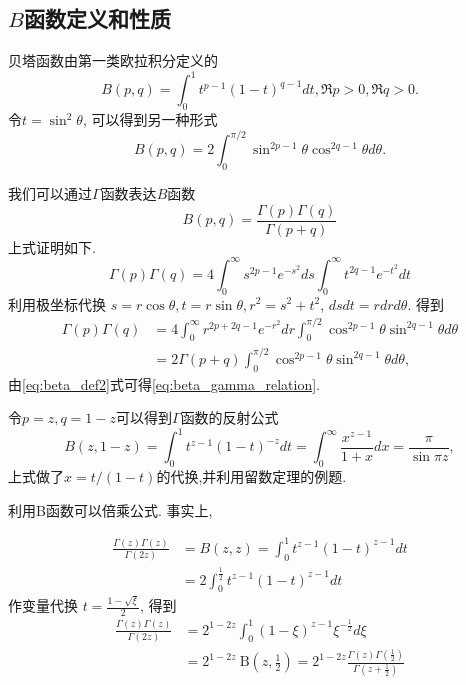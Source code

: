 \subsection{$B$函数定义和性质}
贝塔函数由第一类欧拉积分定义的
\begin{equation}
    B(p, q) = \int_0^1 t^{p -1} (1-t)^{q-1} dt, \Re p> 0, \Re q >0.
    \label{eq:beta_def1}
\end{equation}
令$t=\sin^2{\theta}$, 可以得到另一种形式
\begin{equation}
    B(p, q)  = 2\int_{0}^{\pi/2} \sin ^{2p -1}{\theta} \cos^{2q -1}{\theta} d\theta.
    \label{eq:beta_def2}
\end{equation}

我们可以通过$\Gamma$函数表达$B$函数
\begin{equation}
B(p, q)=\frac{\Gamma(p) \Gamma(q)}{\Gamma(p+q)}
\label{eq:beta_gamma_relation}
\end{equation}
上式证明如下.
$$
\Gamma(p) \Gamma(q)=4 \int_{0}^{\infty} s^{2 p-1} e^{-s^{2}} d s \int_{0}^{\infty} t^{2 q-1} e^{-t^{2}} d t
$$
利用极坐标代换
 $s=r \cos \theta, t=r \sin \theta, r^{2}=s^{2}+t^{2}$,  $d s d t=r d r d \theta$.
 得到
 $$
 \begin{aligned}
 \Gamma(p) \Gamma(q) & =4 \int_{0}^{\infty} r^{2 p+2 q-1} e^{-r^{2}} d r \int_{0}^{\pi / 2} \cos ^{2 p-1} \theta \sin ^{2 q-1} \theta d \theta \\
 & =2 \Gamma(p+q) \int_{0}^{\pi / 2} \cos ^{2 p-1} \theta \sin ^{2 q-1} \theta d \theta,
 \end{aligned}
 $$
 由\eqref{eq:beta_def2}式可得\eqref{eq:beta_gamma_relation}.

令$p=z, q=1-z$可以得到$\Gamma$函数的反射公式
\begin{equation}
    B(z, 1-z) = \int_0^{1} t^{z-1} (1-t)^{-z} dt 
     = \int_0^{\infty} \frac{x^{z-1}}{1+x} dx
     = \frac{\pi}{\sin{\pi z} }, 
\end{equation}
上式做了$x = t/(1-t)$的代换,并利用留数定理的例题.


利用B函数可以倍乘公式. 事实上,

\begin{equation}
\begin{aligned}
\frac{\Gamma(z) \Gamma(z)}{\Gamma(2 z)} & =B(z, z)=\int_{0}^{1} t^{z-1}(1-t)^{z-1} d t \\
& =2 \int_{0}^{\frac{1}{2}} t^{z-1}(1-t)^{z-1} d t
\end{aligned}
\end{equation}
作变量代换 $t=\frac{1-\sqrt{\xi}}{2}$, 得到
$$
\begin{aligned}
\frac{\Gamma(z) \Gamma(z)}{\Gamma(2 z)} & =2^{1-2 z} \int_{0}^{1}(1-\xi)^{z-1} \xi^{-\frac{1}{2}} d \xi \\
& =2^{1-2 z} \mathrm{~B}\left(z, \frac{1}{2}\right)=2^{1-2 z} \frac{\Gamma(z) \Gamma\left(\frac{1}{2}\right)}{\Gamma\left(z+\frac{1}{2}\right)}
\end{aligned}
$$
